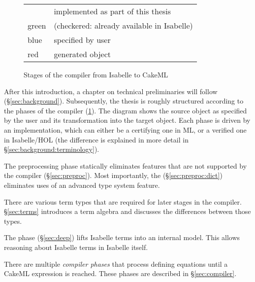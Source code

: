 \begin{figure}[t]

  \small
  \vspace{1em}
  \begin{tabular}{ll}
    \cellcolor{green!20} & implemented as part of this thesis \\
    \multirow{-2}{*}{\cellcolor{green!20}green} & (checkered: already available in Isabelle) \\
    \cellcolor{blue!20}blue & specified by user \\
    \cellcolor{red!20}red & generated object
  \end{tabular}

  \caption{Stages of the compiler from Isabelle to CakeML}
  \label{fig:overview:structure}
\end{figure}

After this introduction, a chapter on technical preliminaries will follow (§\ref{sec:background}).
Subsequently, the thesis is roughly structured according to the phases of the compiler (\cref{fig:overview:structure}).
The diagram shows the source object as specified by the user and its transformation into the target object.
Each phase is driven by an implementation, which can either be a certifying one in ML, or a verified one in Isabelle/HOL (the difference is explained in more detail in §\ref{sec:background:terminology}).

The preprocessing phase statically eliminates features that are not supported by the compiler (§\ref{sec:preproc}).
Most importantly, the  (§\ref{sec:preproc:dict}) eliminates uses of an advanced type system feature.

There are various term types that are required for later stages in the compiler.
§\ref{sec:terms} introduces a term algebra and discusses the differences between those types.

The  phase (§\ref{sec:deep}) lifts Isabelle terms into an internal model.
This allows reasoning about Isabelle terms in Isabelle itself.

There are multiple \emph{compiler phases} that process defining equations until a CakeML expression is reached.
These phases are described in §\ref{sec:compiler}.